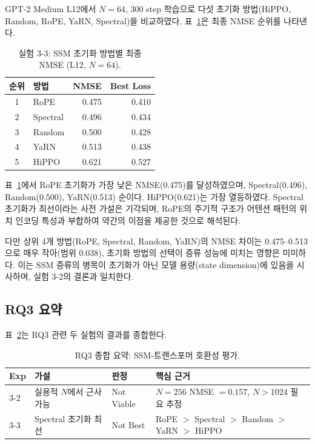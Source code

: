 \documentclass[11pt,a4paper]{article}
\begin{document}
GPT-2 Medium L12에서 $N = 64$, 300 step 학습으로 다섯 초기화 방법(HiPPO, Random, RoPE, YaRN, Spectral)을 비교하였다. 표~\ref{tab:exp33}은 최종 NMSE 순위를 나타낸다.

\begin{table}[H]
\centering
\caption{실험 3-3: SSM 초기화 방법별 최종 NMSE (L12, $N = 64$).}
\label{tab:exp33}
\small
\begin{tabular}{clrr}
\toprule
\textbf{순위} & \textbf{방법} & \textbf{NMSE} & \textbf{Best Loss} \\
\midrule
1 & RoPE & 0.475 & 0.410 \\
2 & Spectral & 0.496 & 0.434 \\
3 & Random & 0.500 & 0.428 \\
4 & YaRN & 0.513 & 0.438 \\
5 & HiPPO & 0.621 & 0.527 \\
\bottomrule
\end{tabular}
\end{table}

표~\ref{tab:exp33}에서 RoPE 초기화가 가장 낮은 NMSE(0.475)를 달성하였으며, Spectral(0.496), Random(0.500), YaRN(0.513) 순이다. HiPPO(0.621)는 가장 열등하였다. Spectral 초기화가 최선이라는 사전 가설은 기각되며, RoPE의 주기적 구조가 어텐션 패턴의 위치 인코딩 특성과 부합하여 약간의 이점을 제공한 것으로 해석된다.

다만 상위 4개 방법(RoPE, Spectral, Random, YaRN)의 NMSE 차이는 0.475--0.513으로 매우 작아(범위 0.038), 초기화 방법의 선택이 증류 성능에 미치는 영향은 미미하다. 이는 SSM 증류의 병목이 초기화가 아닌 모델 용량(state dimension)에 있음을 시사하며, 실험 3-2의 결론과 일치한다.

\subsection{RQ3 요약}

표~\ref{tab:rq3_summary}는 RQ3 관련 두 실험의 결과를 종합한다.

\begin{table}[H]
\centering
\caption{RQ3 종합 요약: SSM-트랜스포머 호환성 평가.}
\label{tab:rq3_summary}
\small
\begin{tabularx}{\textwidth}{@{}lll>{\raggedright\arraybackslash}X@{}}
\toprule
\textbf{Exp} & \textbf{가설} & \textbf{판정} & \textbf{핵심 근거} \\
\midrule
3-2 & 실용적 $N$에서 근사 가능 & \textcolor{failure}{Not Viable} & $N{=}256$ NMSE $= 0.157$, $N > 1024$ 필요 추정 \\
3-3 & Spectral 초기화 최선 & \textcolor{failure}{Not Best} & RoPE $>$ Spectral $>$ Random $>$ YaRN $>$ HiPPO \\
\bottomrule
\end{tabularx}
\end{table}
\end{document}
